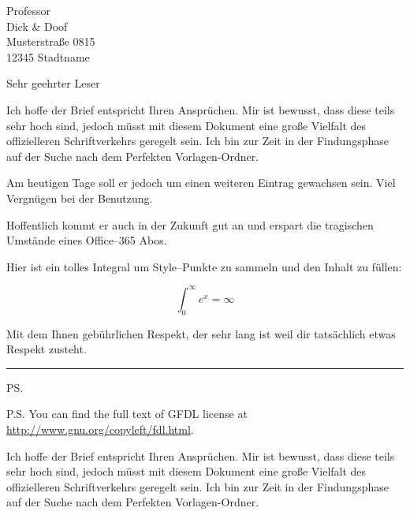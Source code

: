 \documentclass[a4paper]{letter}
\begin{document}

\begin{letter}{Professor \\ Dick \& Doof \\ Musterstraße 0815 \\ 12345 Stadtname}
\opening{Sehr geehrter Leser}

Ich hoffe der Brief entspricht Ihren Ansprüchen. Mir ist bewusst, dass diese teils sehr hoch sind, jedoch müsst mit diesem Dokument eine große Vielfalt des offizielleren Schriftverkehrs geregelt sein. Ich bin zur Zeit in der Findungsphase auf der Suche nach dem Perfekten Vorlagen-Ordner. 

Am heutigen Tage soll er jedoch um einen weiteren Eintrag gewachsen sein. Viel Vergnügen bei der Benutzung. 

Hoffentlich kommt er auch in der Zukunft gut an und erspart die tragischen Umstände eines Office--365 Abos.

Hier ist ein tolles Integral um Style--Punkte zu sammeln und den Inhalt zu füllen:

\begin{equation}
    \int_{0}^{\infty} e^{x} = \infty 
\end{equation}

\closing{Mit dem Ihnen gebührlichen Respekt, der sehr lang ist weil dir tatsächlich etwas Respekt zusteht.}

\vspace{2cm}
\hrule
\ps

P.S. You can find the full text of GFDL license at
\url{http://www.gnu.org/copyleft/fdl.html}.

Ich hoffe der Brief entspricht Ihren Ansprüchen. Mir ist bewusst, dass diese teils sehr hoch sind, jedoch müsst mit diesem Dokument eine große Vielfalt des offizielleren Schriftverkehrs geregelt sein. Ich bin zur Zeit in der Findungsphase auf der Suche nach dem Perfekten Vorlagen-Ordner. 


\end{letter}
\end{document}
